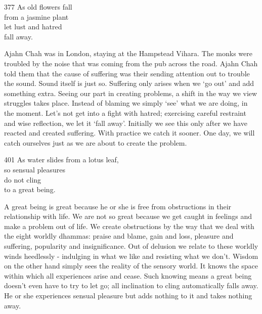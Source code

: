 
\begin{dhpVerse}{377}
\label{dhp-377}
As old flowers fall\\
from a jasmine plant\\
let lust and hatred\\
fall away.
\end{dhpVerse}

\begin{dhpRefl}

Ajahn Chah was in London, staying at the Hampstead Vihara. The monks
were troubled by the noise that was coming from the pub across the
road. Ajahn Chah told them that the cause of suffering was their
sending attention out to trouble the sound. Sound itself is just so.
Suffering only arises when we `go out' and add something extra.
Seeing our part in creating problems, a shift in the way we view
struggles takes place. Instead of blaming we simply `see' what we are
doing, in the moment. Let's not get into a fight with hatred;
exercising careful restraint and wise reflection, we let it `fall
away'. Initially we see this only after we have reacted and created
suffering. With practice we catch it sooner. One day, we will catch
ourselves just as we are about to create the problem.

\end{dhpRefl}


\begin{dhpVerse}{401}
\label{dhp-401}
As water slides from a lotus leaf,\\
so sensual pleasures\\
do not cling\\
to a great being.
\end{dhpVerse}

\begin{dhpRefl}

A great being is great because he or she is free from obstructions in
their relationship with life. We are not so great because we get
caught in feelings and make a problem out of life. We create
obstructions by the way that we deal with the eight worldly dhammas:
praise and blame, gain and loss, pleasure and suffering, popularity
and insignificance. Out of delusion we relate to these worldly winds
heedlessly - indulging in what we like and resisting what we don't.
Wisdom on the other hand simply sees the reality of the sensory
world. It knows the space within which all experiences arise and
cease. Such knowing means a great being doesn't even have to try to
let go; all inclination to cling automatically falls away. He or she
experiences sensual pleasure but adds nothing to it and takes nothing
away.

\end{dhpRefl}

